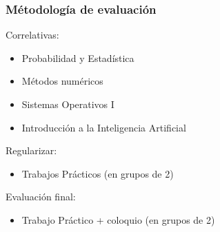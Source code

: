 \begin{frame}
	\frametitle{Métodología de evaluación}
	
	Correlativas:
	\begin{itemize}
		\item Probabilidad y Estadística
		\item Métodos numéricos 
		\item Sistemas Operativos I
		\item Introducción a la Inteligencia Artificial
	\end{itemize}
	
	Regularizar:
	\begin{itemize}
		\item Trabajos Prácticos (en grupos de 2)
	\end{itemize}

	Evaluación final:
	\begin{itemize}
		\item Trabajo Práctico + coloquio (en grupos de 2)
	\end{itemize}	
\end{frame}